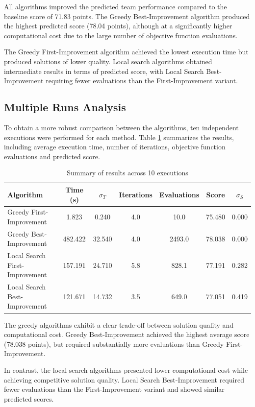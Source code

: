 \documentclass[12pt]{article}
\begin{document}
All algorithms improved the predicted team performance compared to the baseline score of 71.83 points. The Greedy Best-Improvement algorithm
produced the highest predicted score (78.04 points), although at a significantly higher computational cost due to the large number of objective function evaluations.

The Greedy First-Improvement algorithm achieved the lowest execution time but produced solutions of lower quality. Local search algorithms
obtained intermediate results in terms of predicted score, with Local Search Best-Improvement requiring fewer evaluations than the First-Improvement variant.

\subsection{Multiple Runs Analysis}

To obtain a more robust comparison between the algorithms, ten independent executions were performed for each method. Table \ref{tab:benchmark_multiplas_execucoes} 
summarizes the results, including average execution time, number of iterations, objective function evaluations and predicted score.

\begin{table}[htbp]
\centering
\caption{Summary of results across 10 executions}
\label{tab:benchmark_multiplas_execucoes}
\begin{tabular}{lcccccc}
\toprule
Algorithm & Time (s) & $\sigma_T$ & Iterations & Evaluations & Score & $\sigma_S$ \\
\midrule
Greedy First-Improvement & 1.823 & 0.240 & 4.0 & 10.0 & 75.480 & 0.000 \\
Greedy Best-Improvement & 482.422 & 32.540 & 4.0 & 2493.0 & 78.038 & 0.000 \\
Local Search First-Improvement & 157.191 & 24.710 & 5.8 & 828.1 & 77.191 & 0.282 \\
Local Search Best-Improvement & 121.671 & 14.732 & 3.5 & 649.0 & 77.051 & 0.419 \\
\bottomrule
\end{tabular}
\end{table}

The greedy algorithms exhibit a clear trade-off between solution quality and computational cost. Greedy Best-Improvement achieved the highest
average score (78.038 points), but required substantially more evaluations than Greedy First-Improvement.

In contrast, the local search algorithms presented lower computational cost while achieving competitive solution quality. Local Search
Best-Improvement required fewer evaluations than the First-Improvement variant and showed similar predicted scores.
\end{document}
